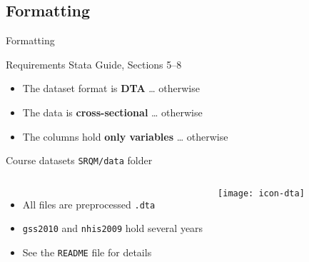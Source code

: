 \documentclass[t]{beamer}
\begin{document}
	\subsection{Formatting}
	
	\begin{frame}[t]{Formatting}
	
	  \begin{block}{Requirements \hfill Stata Guide, Sections 5--8}

			\begin{itemize}
				\item The dataset format is \textbf{DTA} \hfill %
				… otherwise 
				
				\item The data is \textbf{cross-sectional} \hfill %
				… otherwise 
			
				\item The columns hold \textbf{only variables} \hfill %
				… otherwise 
			\end{itemize}

    \end{block}
		
	  \begin{block}{Course datasets \hfill \texttt{SRQM/data} folder}

			\begin{columns}[T]


					\begin{itemize}
						\item All files are preprocessed \texttt{.dta}				
						\item \texttt{gss2010} and \texttt{nhis2009} hold several years
						\item See the \texttt{README} file for details
					\end{itemize}
				
				
					\begin{center}
						\vspace{-1.5em}
						\texttt{[image: icon-dta]}
					\end{center}
				
			\end{columns}

    \end{block}
		
	\end{frame}
	
\end{document}
